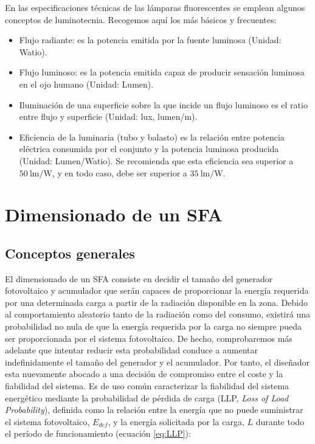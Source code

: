 En las especificaciones técnicas de las lámparas fluorescentes se
emplean algunos conceptos de luminotecnia. Recogemos aquí los más
básicos y frecuentes:
\begin{itemize}
\item Flujo radiante: es la potencia emitida por la fuente luminosa (Unidad:
Watio).
\item Flujo luminoso: es la potencia emitida capaz de producir sensación
luminosa en el ojo humano (Unidad: Lumen).
\item Iluminación de una superficie sobre la que incide un flujo luminoso
es el ratio entre flujo y superficie (Unidad: lux, lumen/m\texttwosuperior{}).
\item Eficiencia de la luminaria (tubo y balasto) es la relación entre potencia
eléctrica consumida por el conjunto y la potencia luminosa producida
(Unidad: Lumen/Watio). Se recomienda que esta eficiencia sea superior
a $\SI{50}{\lumen\per\watt}$, y en todo caso, debe ser superior a
$\SI{35}{\lumen\per\watt}$. 
\end{itemize}

\section{Dimensionado de un SFA\label{sec:DimensionadoSFA}}


\subsection{Conceptos generales}

El dimensionado de un SFA consiste en decidir el tamaño del generador
fotovoltaico y acumulador que serán capaces de proporcionar la energía
requerida por una determinada carga a partir de la radiación disponible
en la zona. Debido al comportamiento aleatorio tanto de la radiación
como del consumo, existirá una probabilidad no nula de que la energía
requerida por la carga no siempre pueda ser proporcionada por el sistema
fotovoltaico. De hecho, comprobaremos más adelante que intentar reducir
esta probabilidad conduce a aumentar indefinidamente el tamaño del
generador y el acumulador. Por tanto, el diseñador esta nuevamente
abocado a una decisión de compromiso entre el coste y la fiabilidad
del sistema. Es de uso común caracterizar la fiabilidad del sistema
energético mediante la probabilidad de pérdida de carga (LLP, \emph{Loss
of Load Probability}), definida como la relación entre la energía
que no puede suministrar el sistema fotovoltaico, $E_{def}$,
y la energía solicitada por la carga, $L$ durante todo el período
de funcionamiento (ecuación \ref{eq:LLP}):

